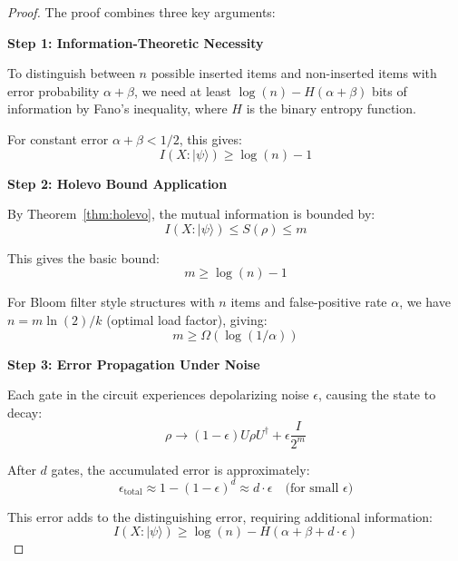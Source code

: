 \documentclass[11pt,letterpaper]{article}
\begin{document}
\begin{proof}
The proof combines three key arguments:

\textbf{Step 1: Information-Theoretic Necessity}

To distinguish between $n$ possible inserted items and non-inserted items with error probability $\alpha + \beta$, we need at least $\log(n) - H(\alpha + \beta)$ bits of information by Fano's inequality, where $H$ is the binary entropy function.

For constant error $\alpha + \beta < 1/2$, this gives:
\begin{equation}
I(X : |\psi\rangle) \geq \log(n) - 1
\end{equation}

\textbf{Step 2: Holevo Bound Application}

By Theorem~\ref{thm:holevo}, the mutual information is bounded by:
\begin{equation}
I(X : |\psi\rangle) \leq S(\rho) \leq m
\end{equation}

This gives the basic bound:
\begin{equation}
m \geq \log(n) - 1
\end{equation}

For Bloom filter style structures with $n$ items and false-positive rate $\alpha$, we have $n = m \ln(2) / k$ (optimal load factor), giving:
\begin{equation}
m \geq \Omega(\log(1/\alpha))
\end{equation}

\textbf{Step 3: Error Propagation Under Noise}

Each gate in the circuit experiences depolarizing noise $\epsilon$, causing the state to decay:
\begin{equation}
\rho \to (1-\epsilon) U \rho U^\dagger + \epsilon \frac{I}{2^m}
\end{equation}

After $d$ gates, the accumulated error is approximately:
\begin{equation}
\epsilon_{\text{total}} \approx 1 - (1-\epsilon)^d \approx d \cdot \epsilon \quad \text{(for small $\epsilon$)}
\end{equation}

This error adds to the distinguishing error, requiring additional information:
\begin{equation}
I(X : |\psi\rangle) \geq \log(n) - H(\alpha + \beta + d \cdot \epsilon)
\end{equation}


\end{proof}
\end{document}
